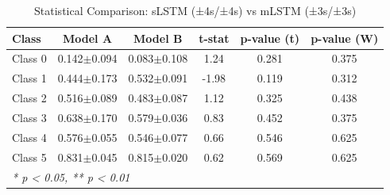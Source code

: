 \begin{table}[htbp]
\centering
\caption{Statistical Comparison: sLSTM (±4s/±4s) vs mLSTM (±3s/±3s)}
\label{tab:comparison_class_slstm_±4s_±4s_vs_mlstm_±3s_±3s}
\begin{tabular}{lccccc}
\toprule
\textbf{Class} & \textbf{Model A} & \textbf{Model B} & \textbf{t-stat} & \textbf{p-value (t)} & \textbf{p-value (W)} \\
\midrule
Class 0 & 0.142$\pm$0.094 & 0.083$\pm$0.108 & 1.24 & 0.281 & 0.375 \\
Class 1 & 0.444$\pm$0.173 & 0.532$\pm$0.091 & -1.98 & 0.119 & 0.312 \\
Class 2 & 0.516$\pm$0.089 & 0.483$\pm$0.087 & 1.12 & 0.325 & 0.438 \\
Class 3 & 0.638$\pm$0.170 & 0.579$\pm$0.036 & 0.83 & 0.452 & 0.375 \\
Class 4 & 0.576$\pm$0.055 & 0.546$\pm$0.077 & 0.66 & 0.546 & 0.625 \\
Class 5 & 0.831$\pm$0.045 & 0.815$\pm$0.020 & 0.62 & 0.569 & 0.625 \\
\bottomrule
\multicolumn{6}{l}{\textit{* p < 0.05, ** p < 0.01}} \\
\end{tabular}
\end{table}